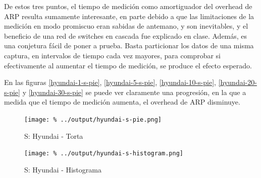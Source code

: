\documentclass[final,inline,a4paper,narroweqnarray]{ieee}
\begin{document}
    De estos tres puntos, el tiempo de medición como amortiguador del
    overhead de ARP resulta sumamente interesante, en parte debido a
    que las limitaciones de la medición en modo promiscuo eran sabidas
    de antemano, y son inevitables, y el beneficio de una red de
    switches en cascada fue explicado en clase. Además, es una
    conjetura fácil de poner a prueba. Basta particionar los datos de
    una misma captura, en intervalos de tiempo cada vez mayores, para
    comprobar si efectivamente al aumentar el tiempo de medición, se
    produce el efecto esperado. 

    En las figuras \ref{hyundai-1-s-pie}, \ref{hyundai-5-s-pie},
    \ref{hyundai-10-s-pie}, \ref{hyundai-20-s-pie} y
    \ref{hyundai-30-s-pie} se puede ver claramente una progresión, en
    la que a medida que el tiempo de medición aumenta, el overhead de
    ARP disminuye.

    \begin{figure}[h]\begin{center}
      \texttt{[image: \%
      ../output/hyundai-s-pie.png]}
      \vspace{-3em}
      \caption{S: Hyundai - Torta}
      \label{hyundai-s-pie}
    \end{center}\end{figure}

    \begin{figure}[h]\begin{center}
      \texttt{[image: \%
      ../output/hyundai-s-histogram.png]}
      \caption{S: Hyundai - Histograma}
      \label{hyundai-s-histogram}
    \end{center}\end{figure}
\end{document}
